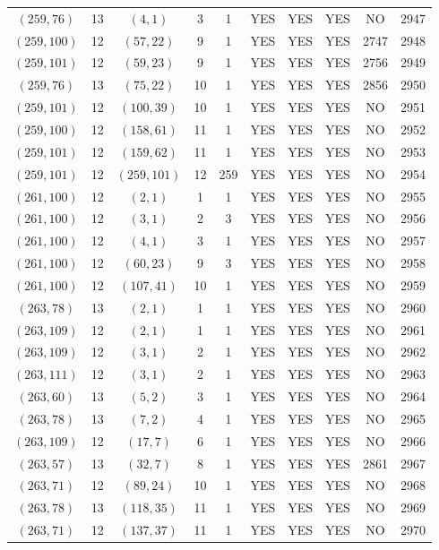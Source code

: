 \begin{longtable}{|c|c|c|c|c|c|c|c|c|c|}
$(259, 76)$ & 13 & $(4, 1)$ & 3 & 1 & YES & YES & YES & NO & 2947\\
$(259, 100)$ & 12 & $(57, 22)$ & 9 & 1 & YES & YES & YES & 2747 & 2948\\
$(259, 101)$ & 12 & $(59, 23)$ & 9 & 1 & YES & YES & YES & 2756 & 2949\\
$(259, 76)$ & 13 & $(75, 22)$ & 10 & 1 & YES & YES & YES & 2856 & 2950\\
$(259, 101)$ & 12 & $(100, 39)$ & 10 & 1 & YES & YES & YES & NO & 2951\\
$(259, 100)$ & 12 & $(158, 61)$ & 11 & 1 & YES & YES & YES & NO & 2952\\
$(259, 101)$ & 12 & $(159, 62)$ & 11 & 1 & YES & YES & YES & NO & 2953\\
$(259, 101)$ & 12 & $(259, 101)$ & 12 & 259 & YES & YES & YES & NO & 2954\\
$(261, 100)$ & 12 & $(2, 1)$ & 1 & 1 & YES & YES & YES & NO & 2955\\
$(261, 100)$ & 12 & $(3, 1)$ & 2 & 3 & YES & YES & YES & NO & 2956\\
$(261, 100)$ & 12 & $(4, 1)$ & 3 & 1 & YES & YES & YES & NO & 2957\\
$(261, 100)$ & 12 & $(60, 23)$ & 9 & 3 & YES & YES & YES & NO & 2958\\
$(261, 100)$ & 12 & $(107, 41)$ & 10 & 1 & YES & YES & YES & NO & 2959\\
$(263, 78)$ & 13 & $(2, 1)$ & 1 & 1 & YES & YES & YES & NO & 2960\\
$(263, 109)$ & 12 & $(2, 1)$ & 1 & 1 & YES & YES & YES & NO & 2961\\
$(263, 109)$ & 12 & $(3, 1)$ & 2 & 1 & YES & YES & YES & NO & 2962\\
$(263, 111)$ & 12 & $(3, 1)$ & 2 & 1 & YES & YES & YES & NO & 2963\\
$(263, 60)$ & 13 & $(5, 2)$ & 3 & 1 & YES & YES & YES & NO & 2964\\
$(263, 78)$ & 13 & $(7, 2)$ & 4 & 1 & YES & YES & YES & NO & 2965\\
$(263, 109)$ & 12 & $(17, 7)$ & 6 & 1 & YES & YES & YES & NO & 2966\\
$(263, 57)$ & 13 & $(32, 7)$ & 8 & 1 & YES & YES & YES & 2861 & 2967\\
$(263, 71)$ & 12 & $(89, 24)$ & 10 & 1 & YES & YES & YES & NO & 2968\\
$(263, 78)$ & 13 & $(118, 35)$ & 11 & 1 & YES & YES & YES & NO & 2969\\
$(263, 71)$ & 12 & $(137, 37)$ & 11 & 1 & YES & YES & YES & NO & 2970\\

\end{longtable}
